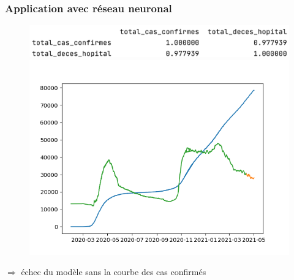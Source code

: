 \documentclass{beamer}[aspectratio = 43]
\begin{document}
\begin{frame}
	\frametitle{Application avec réseau neuronal}
	\begin{figure}
		\includegraphics[scale=0.45]{cor1}
		\includegraphics[scale=0.4]{NN_up}
	\end{figure}
	$\Rightarrow$ échec du modèle sans la courbe des cas confirmés
\end{frame}

\appendix
\end{document}
